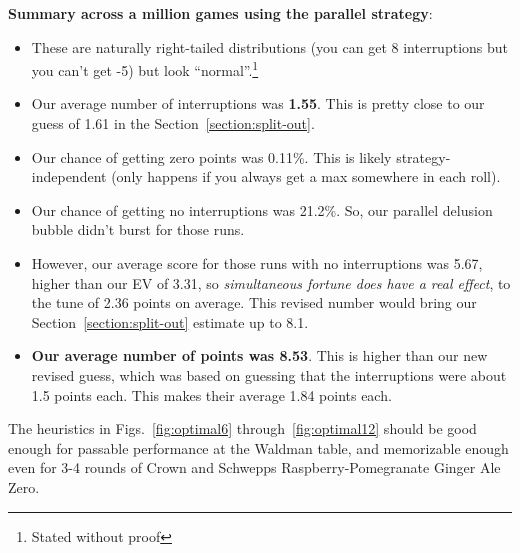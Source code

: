 \documentclass[11pt, oneside]{article} 	%
\begin{document}
\textbf{Summary across a million games using the parallel strategy}:
\begin{itemize}
\item These are naturally right-tailed distributions (you can get 8 interruptions but you can't get -5) but look ``normal''.\footnote{Stated without proof}
\item Our average number of interruptions was \textbf{1.55}.  This is pretty close to our guess of 1.61 in the Section~\ref{section:split-out}.
\item Our chance of getting zero points was 0.11\%.  This is likely strategy-independent (only happens if you always get a max somewhere in each roll).
\item Our chance of getting no interruptions was 21.2\%.  So, our parallel delusion bubble didn't burst for those runs.
\item However, our average score for those runs with no interruptions was 5.67, higher than our EV of 3.31,  so \emph{simultaneous fortune does have a real effect}, to the tune of 2.36 points on average.  This revised number would bring our Section~\ref{section:split-out} estimate up to 8.1.
\item \textbf{Our average number of points was 8.53}.  This is higher than our new revised guess, which was based on guessing that the interruptions were about 1.5 points each.  This makes their average 1.84 points each.
\end{itemize}

The heuristics in Figs.~\ref{fig:optimal6} through~\ref{fig:optimal12} should be good enough for passable performance at the Waldman table, and memorizable enough even for 3-4 rounds of Crown and Schwepps Raspberry-Pomegranate Ginger Ale Zero.
\end{document}

